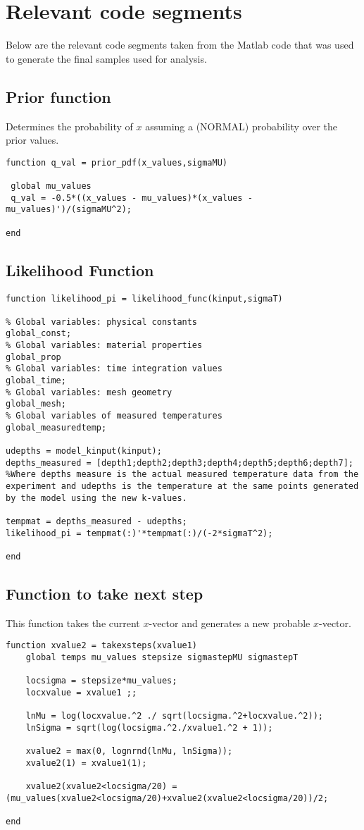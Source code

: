\chapter{Relevant code segments} \label{codeapp}
Below are the relevant code segments taken from the Matlab code that was used to generate the final samples used for analysis.

\section*{Prior function}
Determines the probability of $x$ assuming a (NORMAL) probability over the prior values.
\begin{lstlisting}
function q_val = prior_pdf(x_values,sigmaMU)

 global mu_values
 q_val = -0.5*((x_values - mu_values)*(x_values - mu_values)')/(sigmaMU^2);

end

\end{lstlisting}
\section*{Likelihood Function}

\begin{lstlisting}
function likelihood_pi = likelihood_func(kinput,sigmaT)

% Global variables: physical constants
global_const;
% Global variables: material properties
global_prop
% Global variables: time integration values
global_time;
% Global variables: mesh geometry
global_mesh;
% Global variables of measured temperatures
global_measuredtemp;

udepths = model_kinput(kinput);
depths_measured = [depth1;depth2;depth3;depth4;depth5;depth6;depth7];
%Where depths measure is the actual measured temperature data from the experiment and udepths is the temperature at the same points generated by the model using the new k-values.

tempmat = depths_measured - udepths;
likelihood_pi = tempmat(:)'*tempmat(:)/(-2*sigmaT^2);

end

\end{lstlisting}

\section*{Function to take next step}
This function takes the current $x$-vector and generates a new probable $x$-vector.
\begin{lstlisting}
function xvalue2 = takexsteps(xvalue1)
	global temps mu_values stepsize sigmastepMU sigmastepT

	locsigma = stepsize*mu_values;
	locxvalue = xvalue1 ;;

	lnMu = log(locxvalue.^2 ./ sqrt(locsigma.^2+locxvalue.^2));
	lnSigma = sqrt(log(locsigma.^2./xvalue1.^2 + 1));

	xvalue2 = max(0, lognrnd(lnMu, lnSigma));
	xvalue2(1) = xvalue1(1);

	xvalue2(xvalue2<locsigma/20) = (mu_values(xvalue2<locsigma/20)+xvalue2(xvalue2<locsigma/20))/2;

end
\end{lstlisting}
